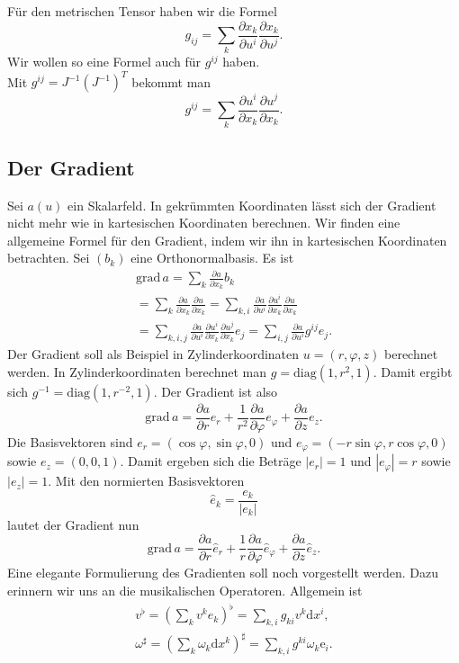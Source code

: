 \documentclass[a4paper,10pt,fleqn,twocolumn,twoside]{article}
\begin{document}
Für den metrischen Tensor haben wir die Formel
\[g_{ij} = \sum_{k} \frac{\partial x_k}{\partial u^i}
\frac{\partial x_k}{\partial u^j}.\]
Wir wollen so eine Formel auch für $g^{ij}$ haben.\\
Mit $g^{ij}=J^{-1}(J^{-1})^T$ bekommt man
\[g^{ij} = \sum_{k} \frac{\partial u^i}{\partial x_k}
\frac{\partial u^j}{\partial x_k}.\]

\subsection{Der Gradient}

Sei $a(u)$ ein Skalarfeld. In gekrümmten Koordinaten lässt sich
der Gradient nicht mehr wie in kartesischen Koordinaten berechnen.
Wir finden eine allgemeine Formel für den Gradient, indem wir ihn in
kartesischen Koordinaten betrachten. Sei $(b_k)$ eine
Orthonormalbasis. Es ist
\begin{gather*}\mathrm{grad}\,a
= \sum_{k}\frac{\partial a}{\partial x_k}b_k\\
= \sum_{k}\frac{\partial a}{\partial x_k}\frac{\partial u}{\partial x_k}
= \sum_{k,i}\frac{\partial a}{\partial u^i}\frac{\partial u^i}{\partial x_k}
\frac{\partial u}{\partial x_k}\\
= \sum_{k,i,j}\frac{\partial a}{\partial u^i}\frac{\partial u^i}{\partial x_k}
\frac{\partial u^j}{\partial x_k}e_j
= \sum_{i,j}\frac{\partial a}{\partial u^i} g^{ij}e_j.
\end{gather*}
%
Der Gradient soll als Beispiel in Zylinderkoordinaten
$u=(r,\varphi,z)$ berechnet werden. In Zylinderkoordinaten
berechnet man $g = \mathrm{diag}(1,r^2,1)$. Damit ergibt sich
$g^{-1} = \mathrm{diag}(1,r^{-2},1)$. Der Gradient ist also
\[\mathrm{grad}\,a = \frac{\partial a}{\partial r} e_r
+\frac{1}{r^2}\frac{\partial a}{\partial \varphi} e_\varphi
+\frac{\partial a}{\partial z} e_z.\]
Die Basisvektoren sind $e_r=(\cos\varphi,\sin\varphi,0)$
und $e_\varphi = (-r\sin\varphi,r\cos\varphi,0)$
sowie $e_z=(0,0,1)$. Damit ergeben sich die Beträge $|e_r|=1$
und $|e_\varphi|=r$ sowie $|e_z|=1$. Mit den normierten
Basisvektoren
\[\hat e_k = \frac{e_k}{|e_k|}\]
lautet der Gradient nun
\[\mathrm{grad}\,a = \frac{\partial a}{\partial r} \hat e_r
+\frac{1}{r}\frac{\partial a}{\partial \varphi}\hat e_\varphi
+\frac{\partial a}{\partial z} \hat e_z.\]
%
Eine elegante Formulierung des Gradienten soll noch vorgestellt
werden. Dazu erinnern wir uns an die musikalischen Operatoren.
Allgemein ist
\begin{gather*}
v^\flat = (\sum_k v^k e_k)^\flat
= \sum_{k,i} g_{ki}v^k\mathrm dx^i,\\
\omega^\sharp = (\sum_k \omega_k\mathrm dx^k)^\sharp
= \sum_{k,i} g^{ki}\omega_k\mathrm e_i.
\end{gather*}
\end{document}
